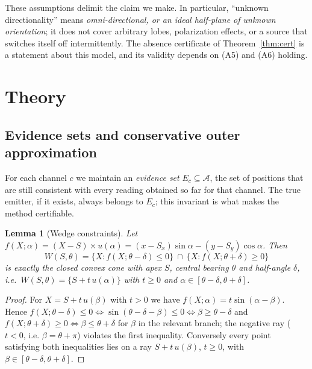 \documentclass[journal,10pt]{IEEEtran}
\newtheorem{lemma}[theorem]{Lemma}
\theoremstyle{definition}
\newcommand{\bA}{\mathcal{A}}
\begin{document}
\noindent These assumptions delimit the claim we make. In particular, ``unknown
directionality'' means \emph{omni-directional, or an ideal half-plane of unknown orientation}; it does not
cover arbitrary lobes, polarization effects, or a source that switches itself off intermittently.
The absence certificate of Theorem~\ref{thm:cert} is a statement about this model, and its
validity depends on (A5) and (A6) holding.

\section{Theory}
\label{sec:theory}

\subsection{Evidence sets and conservative outer approximation}

For each channel $c$ we maintain an \emph{evidence set} $E_c\subseteq\bA$, the set of positions
that are still consistent with every reading obtained so far for that channel. The true emitter,
if it exists, always belongs to $E_c$; this invariant is what makes the method certifiable.

\begin{lemma}[Wedge constraints]
\label{lem:wedge}
Let $f(X;\alpha)=(X-S)\times u(\alpha)=(x-S_x)\sin\alpha-(y-S_y)\cos\alpha$. Then
\begin{equation}
W(S,\theta)=\{X:f(X;\theta-\delta)\le0\}\ \cap\ \{X:f(X;\theta+\delta)\ge0\}
\label{eq:wedge}
\end{equation}
is exactly the closed convex cone with apex $S$, central bearing $\theta$ and half-angle
$\delta$, i.e.\ $W(S,\theta)=\{S+t\,u(\alpha)\}$ with $t\ge0$ and
$\alpha\in[\theta-\delta,\theta+\delta]$.
\end{lemma}
\begin{proof}
For $X=S+t\,u(\beta)$ with $t>0$ we have $f(X;\alpha)=t\sin(\alpha-\beta)$. Hence
$f(X;\theta-\delta)\le0\iff\sin(\theta-\delta-\beta)\le0\iff\beta\ge\theta-\delta$ and
$f(X;\theta+\delta)\ge0\iff\beta\le\theta+\delta$ for $\beta$ in the relevant branch; the
negative ray ($t<0$, i.e. $\beta=\theta+\pi$) violates the first inequality. Conversely every
point satisfying both inequalities lies on a ray $S+t\,u(\beta)$, $t\ge0$, with
$\beta\in[\theta-\delta,\theta+\delta]$.
\end{proof}
\end{document}
